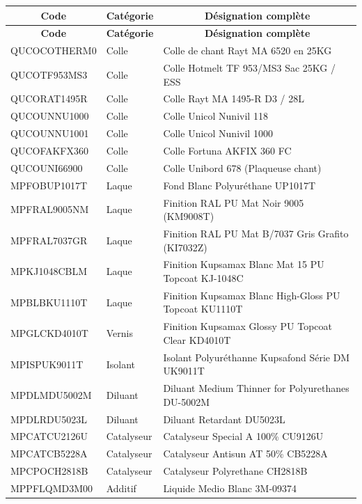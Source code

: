 \documentclass[12pt,a4paper]{article}
\begin{document}
\begin{longtable}{|p{3cm}|p{3cm}|p{8cm}|}
\hline
\multicolumn{1}{|c|}{\textbf{Code}} & \multicolumn{1}{c|}{\textbf{Catégorie}} & \multicolumn{1}{c|}{\textbf{Désignation complète}} \\
\hline
\endfirsthead
\hline
\multicolumn{1}{|c|}{\textbf{Code}} & \multicolumn{1}{c|}{\textbf{Catégorie}} & \multicolumn{1}{c|}{\textbf{Désignation complète}} \\
\hline
\endhead
\hline
\endfoot
QUCOCOTHERM0 & Colle & Colle de chant Rayt MA 6520 en 25KG \\
QUCOTF953MS3 & Colle & Colle Hotmelt TF 953/MS3 Sac 25KG / ESS \\
QUCORAT1495R & Colle & Colle Rayt MA 1495-R D3 / 28L \\
QUCOUNNU1000 & Colle & Colle Unicol Nunivil 118 \\
QUCOUNNU1001 & Colle & Colle Unicol Nunivil 1000 \\
QUCOFAKFX360 & Colle & Colle Fortuna AKFIX 360 FC \\
QUCOUNI66900 & Colle & Colle Unibord 678 (Plaqueuse chant) \\
MPFOBUP1017T & Laque & Fond Blanc Polyuréthane UP1017T \\
MPFRAL9005NM & Laque & Finition RAL PU Mat Noir 9005 (KM9008T) \\
MPFRAL7037GR & Laque & Finition RAL PU Mat B/7037 Gris Grafito (KI7032Z) \\
MPKJ1048CBLM & Laque & Finition Kupsamax Blanc Mat 15 PU Topcoat KJ-1048C \\
MPBLBKU1110T & Laque & Finition Kupsamax Blanc High-Gloss PU Topcoat KU1110T \\
MPGLCKD4010T & Vernis & Finition Kupsamax Glossy PU Topcoat Clear KD4010T \\
MPISPUK9011T & Isolant & Isolant Polyuréthanne Kupsafond Série DM UK9011T \\
MPDLMDU5002M & Diluant & Diluant Medium Thinner for Polyurethanes DU-5002M \\
MPDLRDU5023L & Diluant & Diluant Retardant DU5023L \\
MPCATCU2126U & Catalyseur & Catalyseur Special A 100\% CU9126U \\
MPCATCB5228A & Catalyseur & Catalyseur Antisun AT 50\% CB5228A \\
MPCPOCH2818B & Catalyseur & Catalyseur Polyrethane CH2818B \\
MPPFLQMD3M00 & Additif & Liquide Medio Blanc 3M-09374 \\
\hline
\end{longtable}
\end{document}
